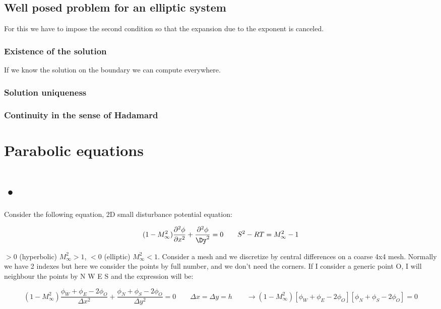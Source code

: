 \subsection{Well posed problem for an elliptic system}
For this we have to impose the second condition so that the expansion due to the exponent is canceled. 

\subsubsection{Existence of the solution}
If we know the solution on the boundary we can compute everywhere. 

\subsubsection{Solution uniqueness}
\subsubsection{Continuity in the sense of Hadamard}

\section{Parabolic equations}

\section{•}
Consider the following equation, 2D small disturbance potential equation: 

\begin{equation}
(1-M^2_\infty) \frac{\D^2 \phi}{\D x^2} + \frac{\D^2\phi}{\Dy^2} = 0 \qquad S^2 - RT = M^2_\infty -1 
\end{equation}

$>0$ (hyperbolic) $M_\infty^2>1$, $<0$ (elliptic) $M_\infty^2<1$. Consider a mesh and we discretize by central differences on a coarse 4x4 mesh. Normally we have 2 indexes but here we consider the points by full number, and we don't need the corners. If I consider a generic point O, I will neighbour the points by N W E S and the expression will be: 

\begin{equation}
(1 - M_\infty^2) \frac{\phi _W + \phi _E - 2\phi _O}{\Delta x^2} + \frac{\phi _N + \phi _S - 2\phi _O}{\Delta y^2} = 0 \qquad \Delta x = \Delta y = h \qquad \rightarrow (1-M_\infty ^2) [\phi _W + \phi _E - 2\phi _O][\phi _N + \phi _S - 2\phi _O] = 0
\end{equation}

